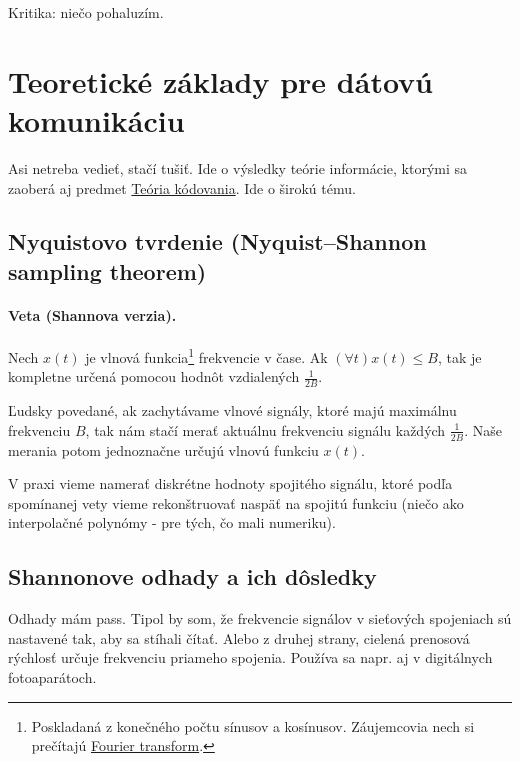 \documentclass[10pt,a4paper]{article}
\begin{document}
Kritika: niečo pohaluzím. 
        
\section{Teoretické základy pre dátovú komunikáciu} 

Asi netreba vedieť, stačí tušiť. Ide o výsledky teórie informácie, ktorými sa zaoberá aj predmet \href{http://www.dcs.fmph.uniba.sk/texty/codebook.pdf}{Teória kódovania}. Ide o širokú tému. 

\subsection{Nyquistovo tvrdenie (Nyquist–Shannon sampling theorem)}             

\paragraph{Veta (Shannova verzia).} Nech $x(t)$ je vlnová funkcia\footnote{
Poskladaná z konečného počtu sínusov a kosínusov. Záujemcovia nech si prečítajú \href{http://en.wikipedia.org/wiki/Fourier_transform}{Fourier transform}.
} frekvencie v čase. Ak $(\forall t)x(t)\leq B$, tak je kompletne určená pomocou hodnôt vzdialených $\frac{1}{2B}$.

Ľudsky povedané, ak zachytávame vlnové signály, ktoré majú maximálnu frekvenciu $B$, tak nám stačí merať aktuálnu frekvenciu signálu každých $\frac{1}{2B}$. Naše merania potom jednoznačne určujú vlnovú funkciu $x(t)$.

V praxi vieme namerať diskrétne hodnoty spojitého signálu, ktoré podľa spomínanej vety vieme rekonštruovať naspäť na spojitú funkciu (niečo ako interpolačné polynómy - pre tých, čo mali numeriku). 
  
\subsection{Shannonove odhady a ich dôsledky}  
Odhady mám pass. 
Tipol by som, že frekvencie signálov v sieťových spojeniach sú nastavené tak, aby sa stíhali čítať. Alebo z druhej strany, cielená prenosová rýchlosť určuje frekvenciu priameho spojenia. 
Používa sa napr. aj v digitálnych fotoaparátoch. 


\end{document}
